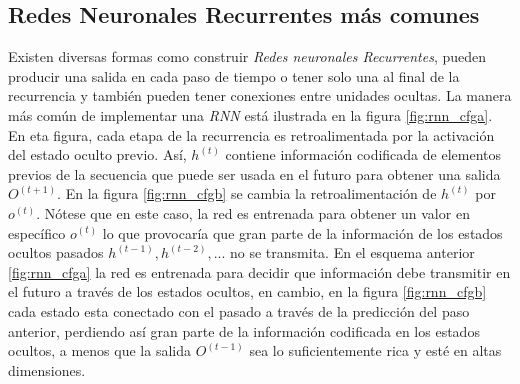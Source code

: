 \subsection{Redes Neuronales Recurrentes más comunes}

Existen diversas formas como construir \textit{Redes neuronales Recurrentes}, pueden producir una
salida en cada paso de tiempo o tener solo una al final de la recurrencia  y también pueden tener
conexiones entre unidades ocultas. La manera más común de implementar una \textit{RNN} está ilustrada en la
figura \ref{fig:rnn_cfga}. En eta figura, cada etapa de la recurrencia es retroalimentada por la
activación del estado oculto previo. Así, $h^{(t)}$ contiene información codificada de elementos
previos de la secuencia que puede ser usada en el futuro para obtener una salida $O^{(t+1)}$. En la
figura \ref{fig:rnn_cfgb} se
cambia la retroalimentación de $h^{(t)}$ por $o^{(t)}$. Nótese que en este caso, la red es entrenada
para obtener un valor en específico $o^{(t)}$ lo que provocaría que gran parte de la información de
los estados ocultos pasados $h^{(t-1)}, h^{(t-2)}, ...$ no se transmita. En el esquema anterior
\ref{fig:rnn_cfga} la red es entrenada para decidir que información debe transmitir en el futuro a través
de los estados ocultos, en cambio, en la figura \ref{fig:rnn_cfgb} cada estado esta conectado con el
pasado a través de la predicción del paso anterior, perdiendo así gran parte de la información
codificada en los estados ocultos, a menos que la salida $O^{(t-1)}$ sea lo suficientemente rica y
esté en altas dimensiones.


